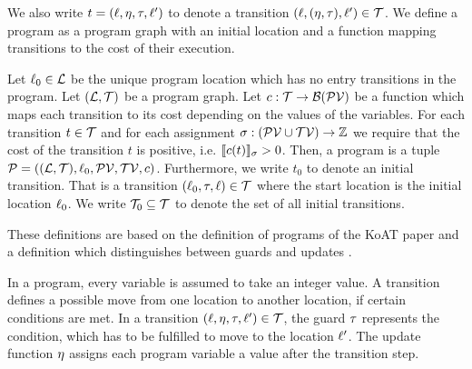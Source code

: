 We also write $t = (\ell, \eta, \tau, \ell')$ to denote a transition $(\ell, (\eta, \tau), \ell') \in \mathcal{T}$.
We define a program as a program graph with an initial location and a function mapping transitions to the cost of their execution.

\begin{definition}[Program] 
  Let $\ell_0 \in \mathcal{L}$ be the unique program location which has no entry transitions in the program.
  Let $(\mathcal{L}, \mathcal{T})$ be a program graph.
  Let $c: \mathcal{T} \rightarrow \mathcal{B}(\mathcal{PV})$ be a function which maps each transition to its cost depending on the values of the variables.
  For each transition $t \in \mathcal{T}$ and for each assignment $\sigma: (\mathcal{PV} \cup \mathcal{TV}) \rightarrow \mathbb{Z}$ we require that the cost of the transition $t$ is positive, i.e. $\llbracket c(t) \rrbracket_{\sigma} > 0$.
  Then, a program is a tuple $\mathcal{P} = ((\mathcal{L}, \mathcal{T}), \ell_0, \mathcal{PV}, \mathcal{TV}, c)$.
  Furthermore, we write $t_0$ to denote an initial transition.
  That is a transition $(\ell_0, \tau, \ell) \in \mathcal{T}$ where the start location is the initial location $\ell_0$.
  We write $\mathcal{T}_0 \subseteq \mathcal{T}$ to denote the set of all initial transitions.
\end{definition}

These definitions are based on the definition of programs of the KoAT paper \cite{koat} and a definition which distinguishes between guards and updates \cite{lowerruntime}.

In a program, every variable is assumed to take an integer value.
A transition defines a possible move from one location to another location, if certain conditions are met.
In a transition $(\ell,\eta,\tau,\ell') \in \mathcal{T}$, the guard $\tau$ represents the condition, which has to be fulfilled to move to the location $\ell'$.
The update function $\eta$ assigns each program variable a value after the transition step.

